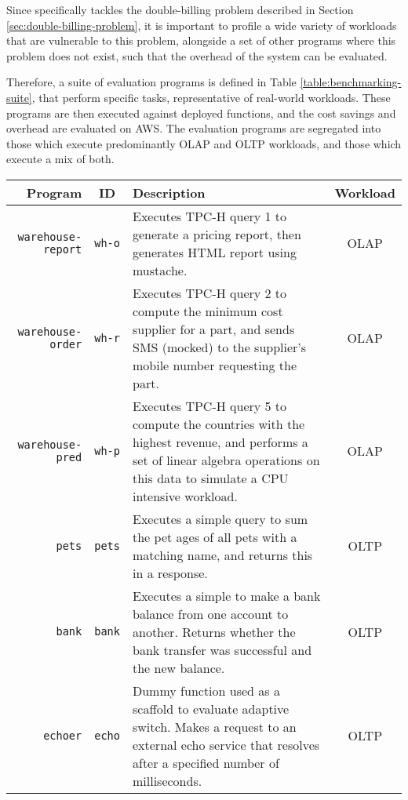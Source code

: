 Since \faaas{} specifically tackles the double-billing problem described in Section \ref{sec:double-billing-problem}, it is important to profile a wide variety of workloads that are vulnerable to this problem, alongside a set of other programs where this problem does not exist, such that the overhead of the system can be evaluated.

Therefore, a suite of evaluation programs is defined in Table \ref{table:benchmarking-suite}, that perform specific tasks, representative of real-world workloads. These programs are then executed against deployed \faaas{} functions, and the cost savings and overhead are evaluated on AWS. The evaluation programs are segregated into those which execute predominantly OLAP and OLTP workloads, and those which execute a mix of both.

\begin{table*}
\begin{tabularx}{\linewidth}{|r|c|X|c|}
    \hline
    \textbf{Program} & \textbf{ID} & \textbf{Description} & \textbf{Workload} \\
    \hline
    \verb|warehouse-report| & \verb|wh-o| & Executes TPC-H query 1 to generate a pricing report, then generates HTML report using mustache. & OLAP \\
    \hline
    \verb|warehouse-order| & \verb|wh-r| & Executes TPC-H query 2 to compute the minimum cost supplier for a part, and sends SMS (mocked) to the supplier's mobile number requesting the part.  & OLAP \\
    \hline
    \verb|warehouse-pred| & \verb|wh-p| & Executes TPC-H query 5 to compute the countries with the highest revenue, and performs a set of linear algebra operations on this data to simulate a CPU intensive workload. & OLAP \\
    \hline
    \verb|pets| & \verb|pets| & Executes a simple query to sum the pet ages of all pets with a matching name, and returns this in a response. & OLTP \\
    \hline
    \verb|bank| & \verb|bank| & Executes a simple to make a bank balance from one account to another. Returns whether the bank transfer was successful and the new balance. & OLTP \\
    \hline
    \verb|echoer| & \verb|echo| & Dummy function used as a scaffold to evaluate adaptive switch. Makes a request to an external echo service that resolves after a specified number of milliseconds. & OLTP \\
    \hline
\end{tabularx}
\caption{Suite of benchmarking programs used to evaluate \faaas{}}
\label{table:benchmarking-suite}
\end{table*}

